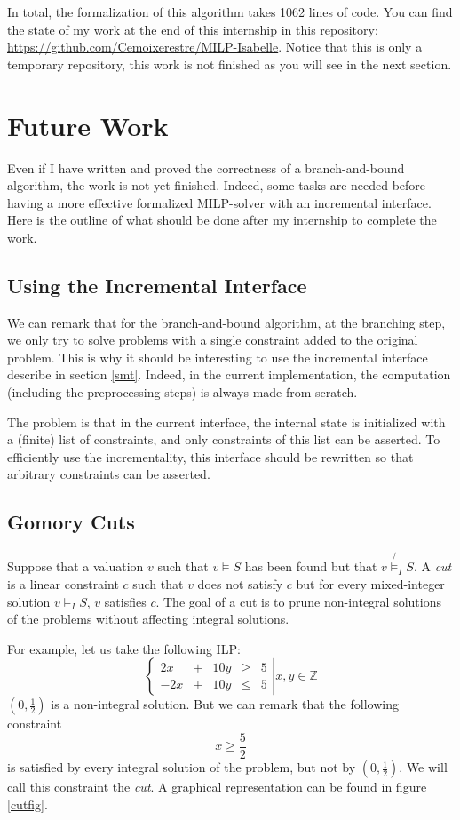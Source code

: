 \documentclass{article}
\newcommand{\ints}{\mathbb{Z}}
\begin{document}
In total, the formalization of this algorithm takes 1062 lines of code. You can
find the state of my work at the end of this internship in this repository:
\url{https://github.com/Cemoixerestre/MILP-Isabelle}. Notice that this is only
a temporary repository, this work is not finished as you will see in the
next section.

\section{Future Work}
Even if I have written and proved the correctness of a branch-and-bound
algorithm, the work is not yet finished. Indeed, some tasks are needed before
having a more effective formalized MILP-solver with an incremental interface.
Here is the outline of what should be done after my internship to complete the
work.

\subsection{Using the Incremental Interface}
We can remark that for the branch-and-bound algorithm, at the branching step, we
only try to solve problems with a single constraint added to the original
problem. This is why it should be interesting to use the incremental interface
describe in section \ref{smt}. Indeed, in the current implementation, the
computation (including the preprocessing steps) is always made from scratch.

The problem is that in the current interface, the internal state is initialized
with a (finite) list of constraints, and only constraints of this list can be
asserted. To efficiently use the incrementality, this interface should be
rewritten so that arbitrary constraints can be asserted.

\subsection{Gomory Cuts}

Suppose that a valuation $v$ such that $v \vDash S$ has been found but that
$v \not{\vDash_I} S$. A \textit{cut} is a
linear constraint $c$ such that $v$ does not satisfy $c$ but for every
mixed-integer solution $v \vDash_I S$, $v$ satisfies $c$. The goal of a cut is
to prune non-integral solutions of the problems without affecting integral
solutions.

For example, let us take the following ILP:
\begin{equation}
  \label{cuteq}
  \left\{
  \begin{array}{ccccc}
    2x  & + & 10y & \geqslant & 5 \\
    -2x & + & 10y & \leqslant & 5
  \end{array}
  \right|
  x, y \in \ints
\end{equation}
$(0, \frac{1}{2})$ is a non-integral solution. But we can remark that the
following constraint $$x \geqslant \frac{5}{2}$$ is satisfied by every integral
solution of the problem, but not by $(0, \frac{1}{2})$. We will call this
constraint the \textit{cut}. A graphical representation can be found in figure
\ref{cutfig}.
\end{document}
